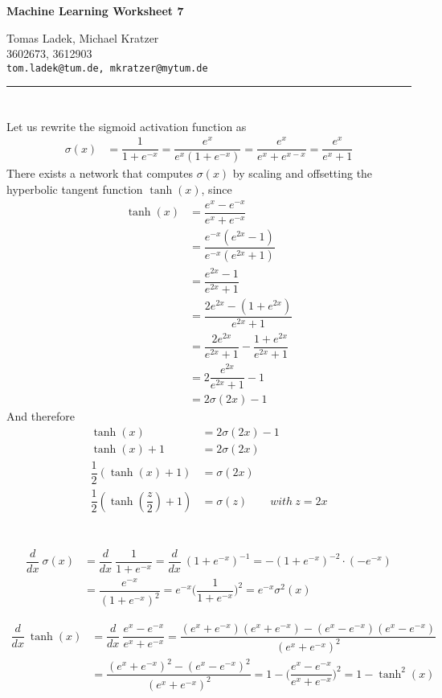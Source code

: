 \documentclass[11pt]{article}
\makeatletter
\newcommand{\exercise}{\section{}}
\newcommand{\hwhead}[4]{
\begin{center}
\sffamily\large\bfseries Machine Learning Worksheet #1
\vspace{2mm}
\normalfont

#2\\
#3\\
\texttt{#4}
\end{center}
\vspace{6mm} \hrule \vspace{4mm}
}
\newcommand{\names}{Tomas Ladek, Michael Kratzer} %
\newcommand{\imats}{3602673, 3612903} %
\newcommand{\emails}{tom.ladek@tum.de, mkratzer@mytum.de} %
\makeatother
\begin{document}
\hwhead{7}{\names}{\imats}{\emails}


\exercise
Let us rewrite the sigmoid activation function as
\begin{align*}
	\sigma(x) &= \dfrac{1}{1 + e^{-x}} = \dfrac{e^x}{e^x (1 + e^{-x})} = \dfrac{e^x}{e^x + e^{x-x}} = \dfrac{e^x}{e^x + 1}
\end{align*}
There exists a network that computes $\sigma(x)$ by scaling and offsetting the hyperbolic tangent function $\tanh(x)$, since
\begin{align*}
	\tanh(x) &= \dfrac{e^x - e^{-x}}{e^x + e^{-x}} \\
	&= \dfrac{e^{-x} (e^{2x} - 1)}{e^{-x} (e^{2x} + 1)} \\
	&= \dfrac{e^{2x} - 1}{e^{2x} + 1} \\
	&= \dfrac{2e^{2x} - (1 + e^{2x})}{e^{2x} + 1} \\
	&= \dfrac{2e^{2x}}{e^{2x} + 1} - \dfrac{1 + e^{2x}}{e^{2x} + 1}\\
	&= 2 \dfrac{e^{2x}}{e^{2x} + 1} - 1\\
	&= 2 \sigma(2x) - 1
\end{align*}
And therefore
\begin{align*}
	\tanh(x) &= 2 \sigma(2x) - 1\\
	\tanh(x) + 1 &= 2 \sigma(2x)\\
	\dfrac{1}{2} (\tanh(x) + 1) &= \sigma(2x)\\
	\dfrac{1}{2} (\tanh(\dfrac{z}{2}) + 1) &= \sigma(z) \quad\quad with\ z = 2x	
\end{align*}

\exercise
\begin{align*}
	\dfrac{d}{dx}\ \sigma(x) &= \dfrac{d}{dx}\ \dfrac{1}{1 + e^{-x}} = \dfrac{d}{dx}\ (1 + e^{-x})^{-1} = - (1 + e^{-x})^{-2} \cdot (-e^{-x})\\
	&= \dfrac{e^{-x}}{(1 + e^{-x})^2} = e^{-x} \Big(\dfrac{1}{1 + e^{-x}}\Big)^2 = e^{-x} \sigma^2(x)
\end{align*}

\begin{align*}
	\dfrac{d}{dx}\ \tanh(x) &= \dfrac{d}{dx}\ \dfrac{e^x - e^{-x}}{e^x + e^{-x}} 
	= \dfrac{(e^x + e^{-x})(e^x + e^{-x}) - (e^x - e^{-x})(e^x - e^{-x})}{(e^x + e^{-x})^2}\\
	&= \dfrac{(e^x + e^{-x})^2 - (e^x - e^{-x})^2}{(e^x + e^{-x})^2} = 1 - \Big(\dfrac{e^x - e^{-x}}{e^x + e^{-x}}\Big)^2 = 1 - \tanh^2(x)
\end{align*}
\end{document}
